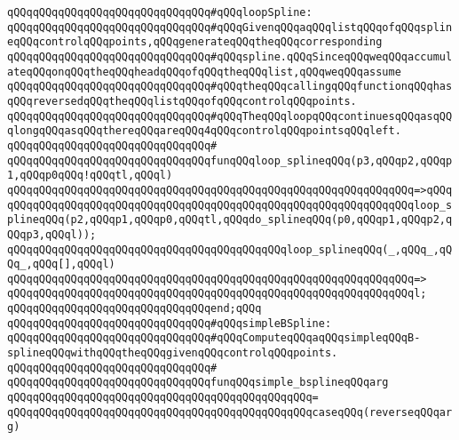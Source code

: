 \verb|qQQqqQQqqQQqqQQqqQQqqQQqqQQqqQQq#qQQqloopSpline:|\newline
\verb|qQQqqQQqqQQqqQQqqQQqqQQqqQQqqQQq#qQQqGivenqQQqaqQQqlistqQQqofqQQqsplineqQQqcontrolqQQqpoints,qQQqgenerateqQQqtheqQQqcorresponding|\newline
\verb|qQQqqQQqqQQqqQQqqQQqqQQqqQQqqQQq#qQQqspline.qQQqSinceqQQqweqQQqaccumulateqQQqonqQQqtheqQQqheadqQQqofqQQqtheqQQqlist,qQQqweqQQqassume|\newline
\verb|qQQqqQQqqQQqqQQqqQQqqQQqqQQqqQQq#qQQqtheqQQqcallingqQQqfunctionqQQqhasqQQqreversedqQQqtheqQQqlistqQQqofqQQqcontrolqQQqpoints.|\newline
\verb|qQQqqQQqqQQqqQQqqQQqqQQqqQQqqQQq#qQQqTheqQQqloopqQQqcontinuesqQQqasqQQqlongqQQqasqQQqthereqQQqareqQQq4qQQqcontrolqQQqpointsqQQqleft.|\newline
\verb|qQQqqQQqqQQqqQQqqQQqqQQqqQQqqQQq#|\newline
\verb|qQQqqQQqqQQqqQQqqQQqqQQqqQQqqQQqfunqQQqloop_splineqQQq(p3,qQQqp2,qQQqp1,qQQqp0qQQq!qQQqtl,qQQql)|\newline
\verb|qQQqqQQqqQQqqQQqqQQqqQQqqQQqqQQqqQQqqQQqqQQqqQQqqQQqqQQqqQQqqQQq=>qQQq|\newline
\verb|qQQqqQQqqQQqqQQqqQQqqQQqqQQqqQQqqQQqqQQqqQQqqQQqqQQqqQQqqQQqqQQqloop_splineqQQq(p2,qQQqp1,qQQqp0,qQQqtl,qQQqdo_splineqQQq(p0,qQQqp1,qQQqp2,qQQqp3,qQQql));|\newline
\newline
\verb|qQQqqQQqqQQqqQQqqQQqqQQqqQQqqQQqqQQqqQQqqQQqloop_splineqQQq(_,qQQq_,qQQq_,qQQq[],qQQql)|\newline
\verb|qQQqqQQqqQQqqQQqqQQqqQQqqQQqqQQqqQQqqQQqqQQqqQQqqQQqqQQqqQQqqQQq=>|\newline
\verb|qQQqqQQqqQQqqQQqqQQqqQQqqQQqqQQqqQQqqQQqqQQqqQQqqQQqqQQqqQQqqQQql;|\newline
\verb|qQQqqQQqqQQqqQQqqQQqqQQqqQQqqQQqend;qQQq|\newline
\newline
\verb|qQQqqQQqqQQqqQQqqQQqqQQqqQQqqQQq#qQQqsimpleBSpline:|\newline
\verb|qQQqqQQqqQQqqQQqqQQqqQQqqQQqqQQq#qQQqComputeqQQqaqQQqsimpleqQQqB-splineqQQqwithqQQqtheqQQqgivenqQQqcontrolqQQqpoints.|\newline
\verb|qQQqqQQqqQQqqQQqqQQqqQQqqQQqqQQq#|\newline
\verb|qQQqqQQqqQQqqQQqqQQqqQQqqQQqqQQqfunqQQqsimple_bsplineqQQqarg|\newline
\verb|qQQqqQQqqQQqqQQqqQQqqQQqqQQqqQQqqQQqqQQqqQQqqQQq=|\newline
\verb|qQQqqQQqqQQqqQQqqQQqqQQqqQQqqQQqqQQqqQQqqQQqqQQqcaseqQQq(reverseqQQqarg)|\newline
